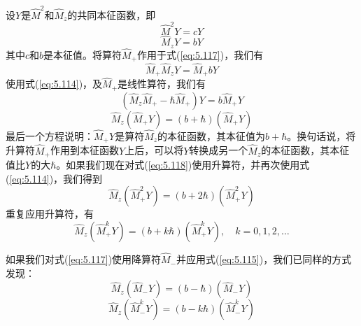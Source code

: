     设$Y$是$\hat{M}^2$和$\hat{M}_z$的共同本征函数，即
    \begin{equation}
        \hat{M}^2Y = cY
        \label{eq:5.116}
    \end{equation}
    \begin{equation}
        \hat{M}_zY = bY
        \label{eq:5.117}
    \end{equation}
    其中$c$和$b$是本征值。将算符$\hat{M}_+$作用于式(\ref{eq:5.117})，我们有
    \begin{equation*}
        \hat{M}_+\hat{M}_zY = \hat{M}_+bY
    \end{equation*}
    使用式(\ref{eq:5.114})，及$\hat{M}_+$是线性算符，我们有
    \begin{equation*}
        \left(\hat{M}_z\hat{M}_+-\hbar\hat{M}_+\right)Y = b\hat{M}_+Y
    \end{equation*}
    \begin{equation}
        \hat{M}_z\left(\hat{M}_+Y\right) = \left(b+\hbar\right)\left(\hat{M}_+Y\right)
        \label{eq:5.118}
    \end{equation}
    最后一个方程说明：$\hat{M}_+Y$是算符$\hat{M}_z$的本征函数，其本征值为$b+\hbar$。换句话说，将升算符$\hat{M}_+$作用到本征函数$Y$上后，可以将$Y$转换成另一个$\hat{M}_z$的本征函数，其本征值比$Y$的大$\hbar$。如果我们现在对式(\ref{eq:5.118})使用升算符，并再次使用式(\ref{eq:5.114})，我们得到
    \begin{equation*}
        \hat{M}_z\left(\hat{M}_+^2Y\right) = \left(b+2\hbar\right)\left(\hat{M}_+^2Y\right)
    \end{equation*}
    重复应用升算符，有
    \begin{equation}
        \hat{M}_z\left(\hat{M}_+^kY\right) = \left(b+k\hbar\right)\left(\hat{M}_+^kY\right), \quad k = 0, 1, 2, \ldots
        \label{eq:5.119}
    \end{equation}

    如果我们对式(\ref{eq:5.117})使用降算符$\hat{M}_-$并应用式(\ref{eq:5.115})，我们已同样的方式发现：
    \begin{equation}
        \hat{M}_z\left(\hat{M}_-Y\right) = \left(b-\hbar\right)\left(\hat{M}_-Y\right)
        \label{eq:5.120}
    \end{equation}
    \begin{equation}
        \hat{M}_z\left(\hat{M}_-^kY\right) = \left(b-k\hbar\right)\left(\hat{M}_-^kY\right)
        \label{eq:5.121}
    \end{equation}


